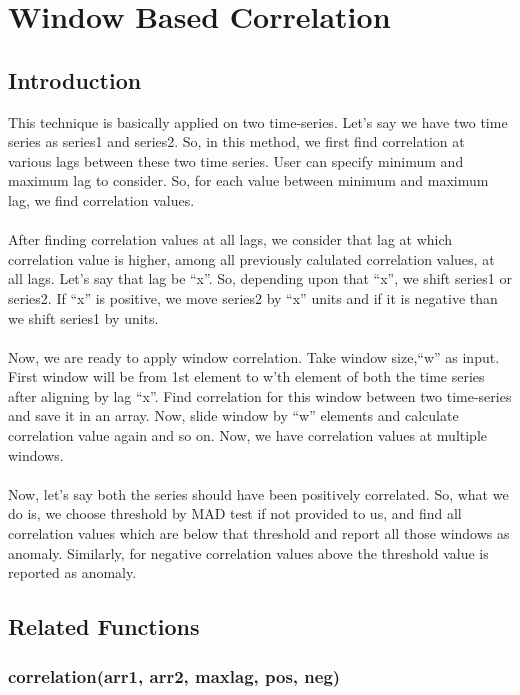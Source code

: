 \chapter{Window Based Correlation}

\section{Introduction}

This technique is basically applied on two time-series. Let's say we have two 
time series as series1 and series2. So, in this method, we first find 
correlation at various lags between these two time series. User can specify 
minimum and maximum lag to consider. So, for each value between minimum and maximum lag, we find correlation values.\\
\\
After finding correlation values at all lags, we consider that lag at which 
correlation value is higher, among all previously calulated correlation values, 
at all lags. Let's say that lag be ``x''. So, depending upon that ``x'', we 
shift series1 or series2. If ``x'' is positive, we move series2 by ``x'' units 
and if it is negative than we shift series1 by  units.\\
\\
Now, we are ready to apply window correlation. Take window size,``w'' as 
input. First window will be from 1st element to w'th element of both the time 
series after aligning by lag ``x''. Find correlation for this window between 
two time-series and save it in an array. Now, slide window by ``w'' elements 
and calculate correlation value again and so on. Now, we have correlation values at 
multiple windows.\\
\\
Now, let's say both the series should have been positively correlated. So, what 
we do is, we choose threshold by MAD test if not provided to us, and find all 
correlation values which are below that threshold and report all those windows 
as anomaly. Similarly, for negative correlation values above the threshold value is reported as anomaly.

\section{Related Functions}

\subsection{correlation(arr1, arr2, maxlag, pos, neg)}

